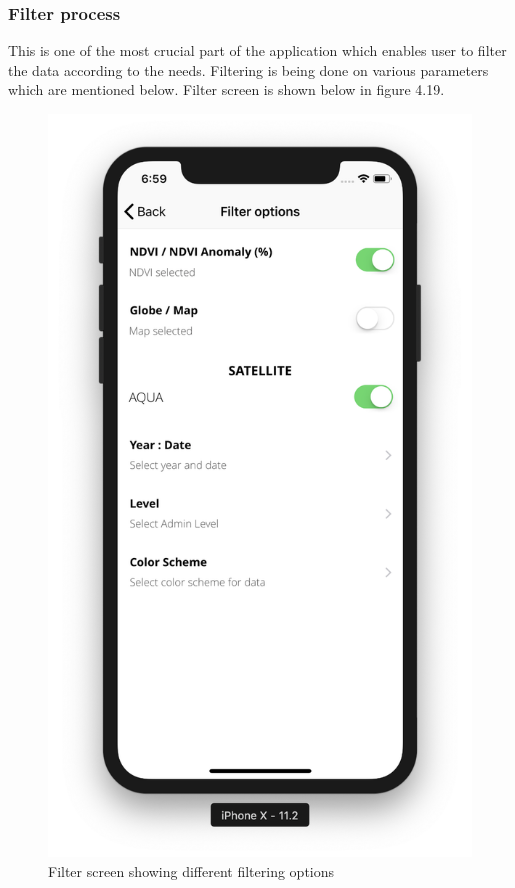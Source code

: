 \subsubsection{Filter process}

This is one of the most crucial part of the application which enables user to filter the data according to the needs. Filtering is being done on various parameters which are mentioned below. Filter screen is shown below in figure 4.19.

    \begin{figure}[H]
            \centering
            \includegraphics[width=0.25\linewidth]{figures/ch4/filter.png}
            \caption{\label{fig:filter_datatype} Filter screen showing different filtering options}
    \end{figure}


